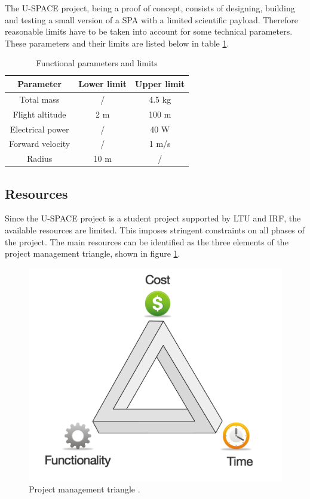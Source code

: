 The \ac{U-SPACE} project, being a proof of concept, consists of designing, building and testing a small version of a \ac{SPA} with a limited scientific payload. Therefore reasonable limits have to be taken into account for some technical parameters. These parameters and their limits are listed below in table \ref{tab:functionality}.

\begin{table}[H]
\centering
\caption{Functional parameters and limits}
\label{tab:functionality}
\begin{tabular}{c c c}
\hline
\textbf{Parameter} & \textbf{Lower limit} & \textbf{Upper limit}\\ \hline
Total mass & / & 4.5 kg\\
Flight altitude & 2 m & 100 m\\
Electrical power & / & 40 W\\
Forward velocity & / & 1 m/s\\
Radius & 10 m & /\\
\hline
\end{tabular}
\end{table}

\subsection{Resources}

Since the \ac{U-SPACE} project is a student project supported by \ac{LTU} and \ac{IRF}, the available resources are limited. This imposes stringent constraints on all phases of the project. The main resources can be identified as the three elements of the project management triangle, shown in figure \ref{fig:project_triangle}.

\begin{figure}[htbp!]
\centering
\includegraphics[scale=0.2]{figures/project_triangle.png}
\caption[Project management triangle]{Project management triangle \cite{website:claromentis}.}
\label{fig:project_triangle}
\end{figure}

